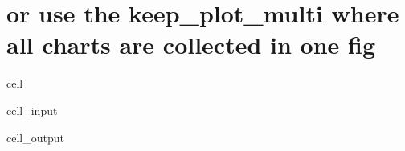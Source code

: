 \documentclass[letterpaper,10pt,english]{jupyterBook}
\begin{document}
\section{or use the keep\_plot\_multi where all charts are collected in one fig}
\label{\detokenize{content/howto/keep/Create and modify charts with keep_plot:or-use-the-keep-plot-multi-where-all-charts-are-collected-in-one-fig}}
\begin{sphinxuseclass}{cell}\begin{sphinxVerbatimInput}

\begin{sphinxuseclass}{cell_input}
\begin{sphinxVerbatim}[commandchars=\\\{\}]
 
      
                                   
\end{sphinxVerbatim}

\end{sphinxuseclass}\end{sphinxVerbatimInput}
\begin{sphinxVerbatimOutput}

\begin{sphinxuseclass}{cell_output}
\noindent{}

\end{sphinxuseclass}\end{sphinxVerbatimOutput}

\end{sphinxuseclass}
\end{document}
